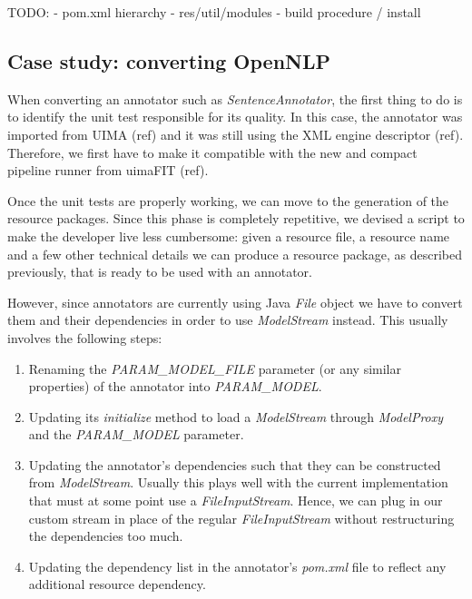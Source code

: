 \documentclass{article}
\newcommand{\id}[1]{\mbox{\textit{#1}}}
\newcommand{\TODO}[1]{\textcolor{YellowOrange}{(#1)}} %
\begin{document}
TODO:
- pom.xml hierarchy
- res/util/modules
- build procedure / install

\subsection{Case study: converting OpenNLP}

When converting an annotator such as \id{SentenceAnnotator}, the first thing to do is to identify the unit test responsible for its quality. In this case, the annotator was imported from UIMA \TODO{ref} and it was still using the XML engine descriptor \TODO{ref}. Therefore, we first have to make it compatible with the new and compact pipeline runner from uimaFIT \TODO{ref}.

Once the unit tests are properly working, we can move to the generation of the resource packages. Since this phase is completely repetitive, we devised a script to make the developer live less cumbersome: given a resource file, a resource name and a few other technical details we can produce a resource package, as described previously, that is ready to be used with an annotator.

However, since annotators are currently using Java \id{File} object we have to convert them and their dependencies in order to use \id{ModelStream} instead. This usually involves the following steps:

\begin{enumerate}

\item Renaming the \id{PARAM\_MODEL\_FILE} parameter (or any similar properties) of the annotator into \id{PARAM\_MODEL}.

\item Updating its \id{initialize} method to load a \id{ModelStream} through \id{ModelProxy} and the \id{PARAM\_MODEL} parameter. 

\item Updating the annotator's dependencies such that they can be constructed from \id{ModelStream}. Usually this plays well with the current implementation that must at some point use a \id{FileInputStream}. Hence, we can plug in our custom stream in place of the regular \id{FileInputStream} without restructuring the dependencies too much.

\item Updating the dependency list in the annotator's \id{pom.xml} file to reflect any additional resource dependency.

\end{enumerate}
\end{document}
